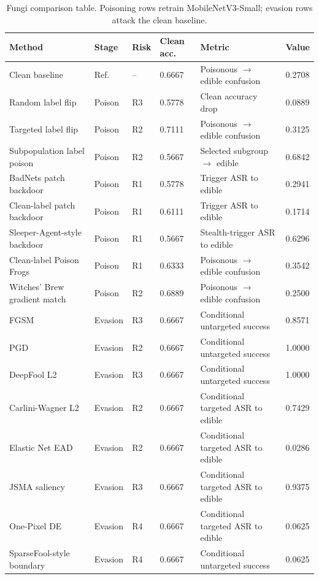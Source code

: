 \documentclass[conference]{IEEEtran}
\begin{document}
\begin{table}[t]
\centering
\caption{Fungi comparison table. Poisoning rows retrain MobileNetV3-Small; evasion rows attack the clean baseline.}
\label{tab:results}
\small
\begin{tabular}{p{}p{}p{}p{}p{}p{}}
\toprule
Method & Stage & Risk & Clean acc. & Metric & Value \\
\midrule
Clean baseline & Ref. & -- & 0.6667 & Poisonous \(\rightarrow\) edible confusion & 0.2708 \\
Random label flip & Poison & R3 & 0.5778 & Clean accuracy drop & 0.0889 \\
Targeted label flip & Poison & R2 & 0.7111 & Poisonous \(\rightarrow\) edible confusion & 0.3125 \\
Subpopulation label poison & Poison & R2 & 0.5667 & Selected subgroup \(\rightarrow\) edible & 0.6842 \\
BadNets patch backdoor & Poison & R1 & 0.5778 & Trigger ASR to edible & 0.2941 \\
Clean-label patch backdoor & Poison & R1 & 0.6111 & Trigger ASR to edible & 0.1714 \\
Sleeper-Agent-style backdoor & Poison & R1 & 0.5667 & Stealth-trigger ASR to edible & 0.6296 \\
Clean-label Poison Frogs & Poison & R1 & 0.6333 & Poisonous \(\rightarrow\) edible confusion & 0.3542 \\
Witches' Brew gradient match & Poison & R2 & 0.6889 & Poisonous \(\rightarrow\) edible confusion & 0.2500 \\
FGSM & Evasion & R3 & 0.6667 & Conditional untargeted success & 0.8571 \\
PGD & Evasion & R2 & 0.6667 & Conditional untargeted success & 1.0000 \\
DeepFool L2 & Evasion & R3 & 0.6667 & Conditional untargeted success & 1.0000 \\
Carlini-Wagner L2 & Evasion & R2 & 0.6667 & Conditional targeted ASR to edible & 0.7429 \\
Elastic Net EAD & Evasion & R2 & 0.6667 & Conditional targeted ASR to edible & 0.0286 \\
JSMA saliency & Evasion & R3 & 0.6667 & Conditional targeted ASR to edible & 0.9375 \\
One-Pixel DE & Evasion & R4 & 0.6667 & Conditional targeted ASR to edible & 0.0625 \\
SparseFool-style boundary & Evasion & R4 & 0.6667 & Conditional untargeted success & 0.0625 \\

\end{tabular}
\end{table}
\end{document}
